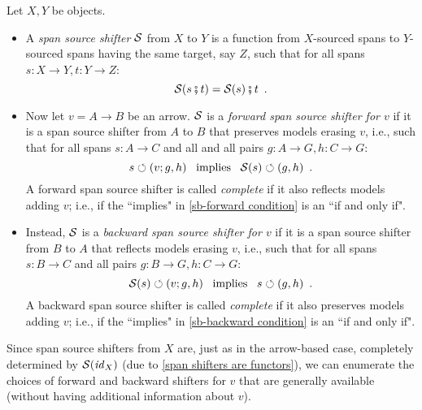 \begin{definition}
Let $X,Y$ be objects.
\begin{itemize}[topsep=\smallskipamount]
\item A \emph{span source shifter} $\mathcal{S}$ from $X$ to $Y$ is a function from $X$-sourced spans to $Y$-sourced spans having the same target, say $Z$, such that for all spans $s:X\to Y,t:Y\to Z$:
%
\begin{equation}\eqlabel{span shifters are functors}
\cS(s \spcomp t) = \cS(s)\spcomp t \enspace.
\end{equation}
%
\item Now let $v=A\to B$ be an arrow. $\mathcal{S}$ is a \emph{forward span source shifter for $v$} if it is a span source shifter from $A$ to $B$ that preserves models erasing $v$, i.e., such that for all spans $s:A\to C$ and all and all pairs $g:A\to G,h:C \to G$:
%
\begin{equation}\eqlabel{sb-forward condition}
s\commutes (v;g,h) \enspace\text{ implies }\enspace \cS(s) \commutes (g,h) \enspace.
\end{equation}
%
A forward span source shifter is called \emph{complete} if it also reflects models adding $v$; i.e., if the ``implies" in \eqref{sb-forward condition} is an ``if and only if".

\item Instead, $\mathcal{S}$ is a \emph{backward span source shifter for $v$} if it is a span source shifter from $B$ to $A$ that reflects models erasing $v$, i.e., such that for all spans $s:B\to C$ and all pairs $g:B\to G,h:C\to G$:
%
\begin{equation}\eqlabel{sb-backward condition}
\cS(s) \commutes (v;g,h) \enspace\text{ implies }\enspace s\commutes (g,h) \enspace.
\end{equation}
%
A backward span source shifter is called \emph{complete} if it also preserves models adding $v$; i.e., if the ``implies" in \eqref{sb-backward condition} is an ``if and only if".
\end{itemize}
\end{definition}
%
Since span source shifters from $X$ are, just as in the arrow-based case, completely determined by $\mathcal{S}(\mathit{id}_X)$ (due to \eqref{span shifters are functors}), we can enumerate the choices of forward and backward shifters for $v$ that are generally available (without having additional information about $v$).
%
